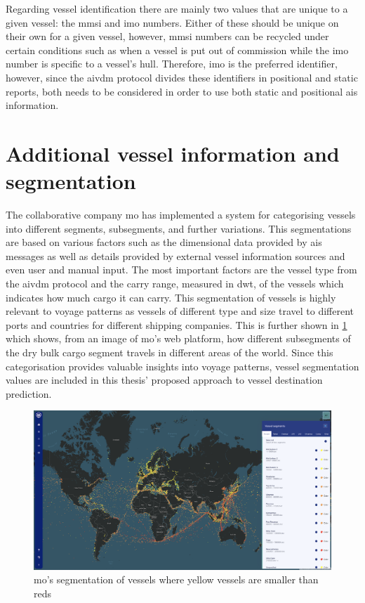 Regarding vessel identification there are mainly two values that are unique to a given vessel: the \acrshort{mmsi} and \acrshort{imo} numbers. Either of these should be unique on their own for a given vessel, however, \acrshort{mmsi} numbers can be recycled under certain conditions such as when a vessel is put out of commission while the \acrshort{imo} number is specific to a vessel's hull. Therefore, \acrshort{imo} is the preferred identifier, however, since the \gls{aivdm} protocol divides these identifiers in positional and static reports, both needs to be considered in order to use both static and positional \acrshort{ais} information.

\section{Additional vessel information and segmentation}

The collaborative company \acrfull{mo} has implemented a system for categorising vessels into different segments, subsegments, and further variations. This segmentations are based on various factors such as the dimensional data provided by \acrshort{ais} messages as well as details provided by external vessel information sources and even user and manual input. The most important factors are the vessel type from the \gls{aivdm} protocol and the carry range, measured in \acrshort{dwt}, of the vessels which indicates how much cargo it can carry. This segmentation of vessels is highly relevant to voyage patterns as vessels of different type and size travel to different ports and countries for different shipping companies. This is further shown in \cref{fig:segment_map} which shows, from an image of \acrshort{mo}'s web platform, how different subsegments of the dry bulk cargo segment travels in different areas of the world. Since this categorisation provides valuable insights into voyage patterns, vessel segmentation values are included in this thesis' proposed approach to vessel destination prediction.

\begin{figure}[htbp]  %
    \centering
    \includegraphics[width=1.0\textwidth]{figures/segment_map}
    \caption{\acrfull{mo}’s segmentation of vessels where yellow vessels are smaller than reds}
    \label{fig:segment_map}
\end{figure}

